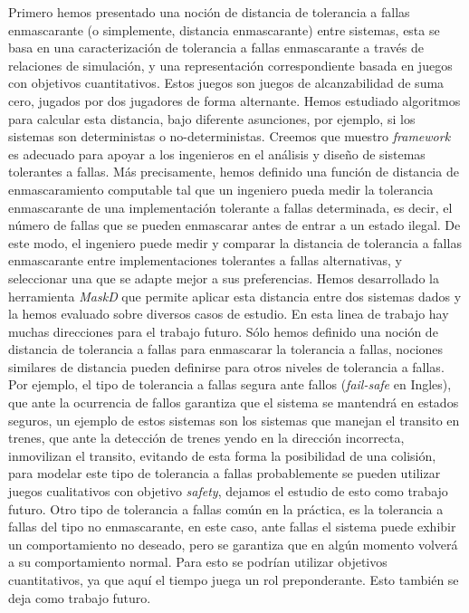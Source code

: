 Primero hemos presentado una noción de distancia de tolerancia a fallas enmascarante (o simplemente, distancia enmascarante) entre sistemas, esta se basa en una caracterización de tolerancia a fallas enmascarante a través de relaciones de simulación, y una representación correspondiente basada en juegos con objetivos cuantitativos. Estos juegos son juegos de alcanzabilidad de suma cero, jugados por dos jugadores de forma alternante. Hemos estudiado algoritmos para calcular esta distancia, bajo diferente asunciones, por ejemplo, si los sistemas son deterministas o no-deterministas. 
Creemos que muestro \textit{framework} es adecuado para apoyar a los ingenieros en el análisis y
diseño de sistemas tolerantes a fallas. Más precisamente, hemos definido una función de distancia de enmascaramiento computable tal que un ingeniero pueda medir la tolerancia enmascarante de una 
implementación tolerante a fallas determinada, es decir, el número de fallas que se pueden enmascarar antes de entrar a un estado ilegal.
De este modo, el ingeniero puede medir y comparar la distancia de tolerancia a fallas enmascarante entre implementaciones tolerantes a fallas alternativas, y seleccionar una que
se adapte mejor a sus preferencias.
Hemos desarrollado la herramienta \emph{MaskD} que permite aplicar esta distancia entre dos sistemas dados y la hemos evaluado sobre diversos casos de estudio.
En esta linea de trabajo hay muchas direcciones para el trabajo futuro. Sólo hemos definido una noción de distancia de tolerancia a fallas para enmascarar la tolerancia a fallas, nociones similares de distancia pueden definirse para otros niveles de tolerancia a fallas. Por ejemplo, el tipo de tolerancia a fallas segura ante fallos (\textit{fail-safe} en Ingles), que ante la ocurrencia de fallos garantiza que el sistema se mantendrá en estados seguros, un ejemplo de estos sistemas son los sistemas que manejan el transito en trenes, que ante la detección de trenes yendo en la dirección incorrecta, inmovilizan el transito, evitando de esta forma la posibilidad de una colisión, para modelar este tipo de tolerancia a fallas probablemente se pueden utilizar juegos cualitativos con objetivo \textit{safety}, dejamos el estudio de esto como trabajo futuro. Otro tipo de tolerancia a fallas común en la práctica, es la tolerancia a fallas del tipo no enmascarante, en este caso, ante fallas el sistema puede exhibir un comportamiento no deseado, pero se garantiza que en algún momento volverá a su comportamiento normal. Para esto se podrían utilizar objetivos cuantitativos, ya que aquí el tiempo juega un rol preponderante. Esto también se deja como trabajo futuro.

